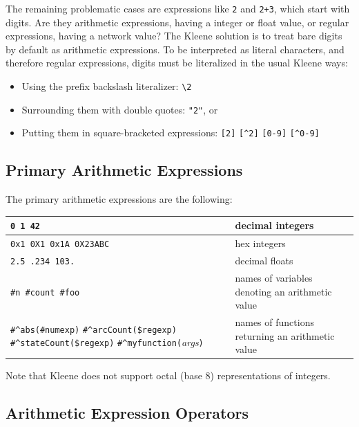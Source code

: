 \documentclass[letterpaper,12pt]{article}
\newcommand{\Kleene}{Kleene\xspace}
\begin{document}
The remaining problematic cases are expressions like \verb!2! and
\verb!2+3!, which start with digits.  Are they arithmetic expressions,
having a integer or float value, or regular expressions, having a network
value?  The \Kleene{} solution is to treat bare digits by default as
arithmetic expressions.  To be interpreted as literal characters, and
therefore regular expressions, digits must be literalized in the usual
\Kleene{} ways:

\begin{itemize}
\item
Using the prefix backslash literalizer:  \verb!\2!
\item
Surrounding them with double quotes: \verb!"2"!, or
\item
Putting them in square-bracketed expressions: \verb![2]! \verb![^2]! \verb![0-9]! \verb![^0-9]!
\end{itemize}

\subsection{Primary Arithmetic Expressions}

The primary arithmetic expressions are the following:

\vspace{.5cm}

\renewcommand\tabcolsep{1.25mm}

\noindent
\begin{tabular}{|p{5.5cm}|l|}
\hline
\verb!0 1 42!  & decimal integers\\
\hline
\verb!0x1 0X1 0x1A 0X23ABC! & hex integers\\
\hline
\verb!2.5 .234 103.! & decimal floats\\
\hline
\verb!#n #count #foo! & names of variables denoting an arithmetic value\\
\hline
\verb!#^abs(#numexp)! \verb!#^arcCount($regexp)!
\verb!#^stateCount($regexp)! \verb!#^myfunction(!\emph{args}\verb!)! & names of functions returning an arithmetic value\\
\hline
\end{tabular}

\vspace{.5cm}

\noindent
Note that \Kleene{} does not support octal (base 8) representations of integers.

\subsection{Arithmetic Expression Operators}
\end{document}
